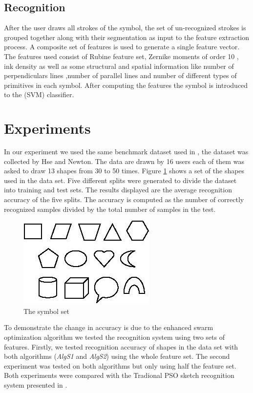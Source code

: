\documentclass[12pt,1p,times]{elsarticle}%
\begin{document}
\subsection{Recognition}
\label{sec:Recognition}
After the user draws all strokes of the symbol, the set of un-recognized strokes is grouped together along with their segmentation as input to the feature extraction process. A composite set of features is used to generate a single feature vector. The features used consist of Rubine feature set,  Zernike moments of order 10 \cite{HeloiseBeautification}, ink density as well as some structural and spatial information like number of perpendiculars lines ,number of parallel lines and number of different types of primitives in each symbol. After computing the features the symbol is introduced to the (SVM) classifier. 

\cite{mypaper}  
\section{Experiments} 
\label{sec:Experiments}
In our experiment we used the same benchmark dataset used in \cite{mypaper}, the dataset was collected by Hse and Newton\cite{HeloiseBeautification}. The data are drawn by 16 users each of them was asked to draw 13 shapes from 30 to 50 times. Figure \ref{fig:symbolSet} shows a set of the shapes used in the data set. Five different splits were generated to divide the dataset into training and test sets. The results displayed are the average recognition accuracy of the five splits. The accuracy is computed as the number of correctly recognized samples divided by the total number of samples in the test.
	 
 \begin{figure}
  \centering 
 
		\includegraphics[scale=0.5]{symbolSet.PNG} 
		\caption[The Symbol Set] {The symbol set}   \label{fig:symbolSet}
	 \end{figure}
	
To demonstrate the change in accuracy is due to the enhanced swarm optimization algorithm we tested the recognition system using two sets of features. Firstly, we tested recognition accuracy of shapes in the data set with both algorithms (\textsl{AlgS1} and \textsl{AlgS2}) using the whole feature set. The second experiment was tested on both algorithms but only using half the feature set. Both experiments were compared with the Tradional PSO sketch recognition system presented in \cite{mypaper}. 
\end{document}
